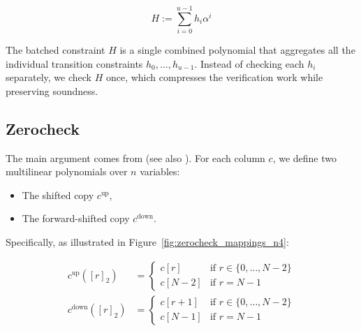 \documentclass{article}
\begin{document}
$$H := \sum_{i=0}^{u-1} h_i \alpha^i $$

The batched constraint $H$ is a single combined polynomial that aggregates all the individual transition constraints $h_0, \dots, h_{u-1}$. Instead of checking each $h_i$ separately, we check $H$ once, which compresses the verification work while preserving soundness.

\subsection{Zerocheck} \label{zerocheck}

The main argument comes from \cite{ccs} (see also \cite{simple_multivariate_AIR}). For each column $c$, we define two multilinear polynomials over $n$ variables:
\begin{itemize}
    \item The shifted copy $c^{\text{up}}$,
    \item The forward-shifted copy $c^{\text{down}}$.
\end{itemize}

Specifically, as illustrated in Figure~\ref{fig:zerocheck_mappings_n4}:

\begin{equation}
\begin{aligned}
c^{\text{up}}([r]_2) &= 
\begin{cases}
c[r] & \text{if } r \in \{0, \dots, N - 2\} \\
c[N - 2] & \text{if } r = N - 1
\end{cases} \\
c^{\text{down}}([r]_2) &= 
\begin{cases}
c[r + 1] & \text{if } r \in \{0, \dots, N - 2\} \\
c[N - 1] & \text{if } r = N - 1
\end{cases}
\end{aligned}
\end{equation}
\end{document}
